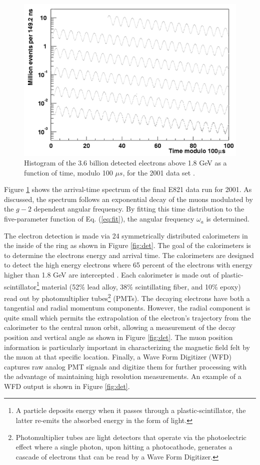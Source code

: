 \documentclass{outhesis}
\begin{document}
 \begin{figure}
  \centering
  \includegraphics[scale=0.5]{figures/oscillation}
  \caption{Histogram of the 3.6 billion detected electrons above 1.8 GeV as a function of time, modulo 100 $\mu s$, for the 2001 data set \cite{bnl}.}
  \label{fig:osc}
\end{figure}
Figure \ref{fig:osc} shows the arrival-time spectrum of the final E821 data run for 2001. As discussed, the spectrum follows an exponential decay of the muons modulated by the $g-2$ dependent angular frequency. By fitting this time distribution to the five-parameter function of Eq. (\ref{eq:fit}), the angular frequency $\omega_a$ is determined.

The electron detection is made via 24 symmetrically distributed calorimeters in the inside of the ring as shown in Figure \ref{fig:det}. The goal of the calorimeters is to determine the electrons energy and arrival time. The calorimeters are designed to detect the high energy electrons where 65 percent of the electrons with energy higher than 1.8 GeV are intercepted \cite[p.~29]{bnl}. Each calorimeter is made out of plastic-scintillator\footnote{A particle deposits energy when it passes through a plastic-scintillator, the latter re-emits the absorbed energy in the form of light. } material (52\% lead alloy, 38\% scintillating fiber, and 10\% epoxy) read out by photomultiplier tubes\footnote{Photomultiplier tubes are light detectors that operate via the photoelectric effect where a single photon, upon hitting a photocathode, generates a cascade of electrons that can be read by a Wave Form Digitizer.} (PMTs). The decaying electrons have both a tangential and radial momentum components. However, the radial component is quite small which permits the extrapolation of the electron's trajectory from the calorimeter to the central muon orbit, allowing a measurement of the decay position and vertical angle as shown in Figure \ref{fig:det}. The muon position information is particularly important in characterizing the magnetic field felt by the muon at that specific location. 
Finally, a Wave Form Digitizer (WFD) captures raw analog PMT signals and digitize them for further processing with the advantage of maintaining high resolution measurements. An example of a WFD output is shown in Figure \ref{fig:det}.
\end{document}

